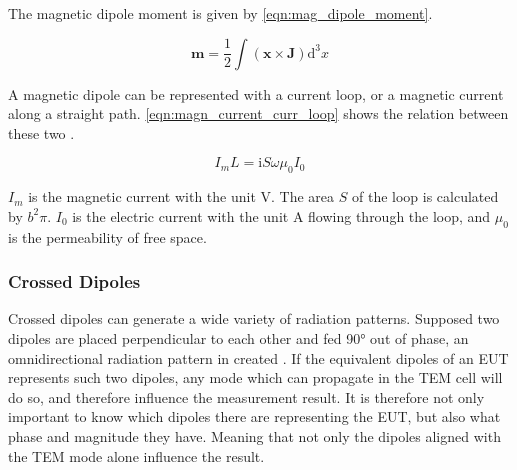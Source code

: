 The magnetic dipole moment is given by \autoref{eqn:mag_dipole_moment}.

\begin{equation}
    \mathbf{m}=\frac{1}{2}\int (\mathbf{x} \times \mathbf{J})\mathrm{d}^3x
    \label{eqn:mag_dipole_moment}
\end{equation}

A magnetic dipole can be represented with a current loop, or a magnetic current along a straight path. \autoref{eqn:magn_current_curr_loop} shows the relation between these two \cite{Balanis_1997}. 

\begin{equation}
    I_m L = \mathrm{i}S\omega\mu_0 I_0
    \label{eqn:magn_current_curr_loop}
\end{equation}

$I_m$ is the magnetic current with the unit $\mathrm{V}$. The area $S$ of the loop is calculated by $b^2\pi$. $I_0$ is the electric current with the unit $\mathrm{A}$ flowing through the loop, and $\mu_0$ is the permeability of free space.


\subsubsection{Crossed Dipoles}


Crossed dipoles can generate a wide variety of radiation patterns. Supposed two dipoles are placed perpendicular to each other and fed 90° out of phase, an omnidirectional radiation pattern in created \cite{7293591}. If the equivalent dipoles of an EUT represents such two dipoles, any mode which can propagate in the TEM cell will do so, and therefore influence the measurement result. It is therefore not only important to know which dipoles there are representing the EUT, but also what phase and magnitude they have. Meaning that not only the dipoles aligned with the TEM mode alone influence the result. 


